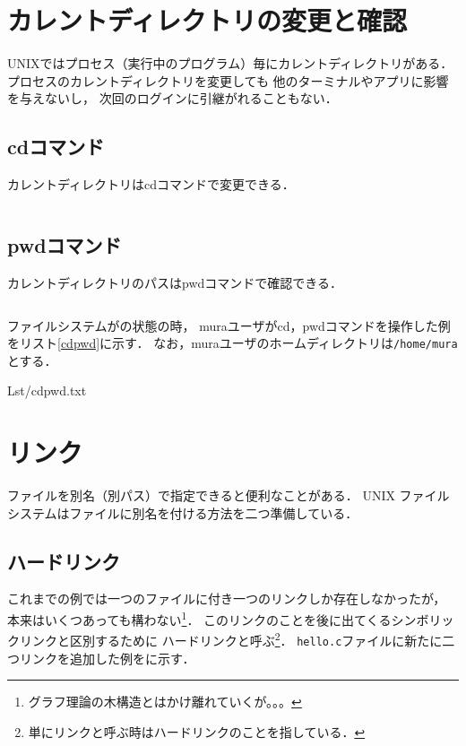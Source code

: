 \section{カレントディレクトリの変更と確認}
UNIXではプロセス（実行中のプログラム）毎にカレントディレクトリがある．
プロセスのカレントディレクトリを変更しても
他のターミナルやアプリに影響を与えないし，
次回のログインに引継がれることもない．

\subsection*{cdコマンド}
カレントディレクトリはcdコマンドで変更できる．

\begin{lstlisting}[numbers=none]
% cd パス     # パスのディレクトリへ移動する
\end{lstlisting}

\subsection*{pwdコマンド}
カレントディレクトリのパスはpwdコマンドで確認できる．

\begin{lstlisting}[numbers=none]
% pwd         # カレントディレクトリのパスを表示する
\end{lstlisting}

ファイルシステムがの状態の時，
muraユーザがcd，pwdコマンドを操作した例をリスト\ref{cdpwd}に示す．
なお，muraユーザのホームディレクトリは\texttt{/home/mura}とする．


                {Lst/cdpwd.txt}

\section{リンク}
ファイルを別名（別パス）で指定できると便利なことがある．
UNIX ファイルシステムはファイルに別名を付ける方法を二つ準備している．

\subsection{ハードリンク}
これまでの例では一つのファイルに付き一つのリンクしか存在しなかったが，
本来はいくつあっても構わない\footnote{
グラフ理論の木構造とはかけ離れていくが。。。}．
このリンクのことを後に出てくるシンボリックリンクと区別するために
ハードリンクと呼ぶ\footnote{
単にリンクと呼ぶ時はハードリンクのことを指している．}．
\texttt{hello.c}ファイルに新たに二つリンクを追加した例をに示す．


